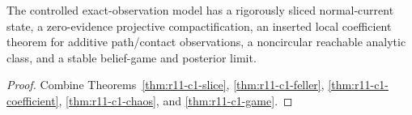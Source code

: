 \begin{theorem}
\label{thm:r11-c1-main}
The controlled exact-observation model has a rigorously sliced normal-current
state, a zero-evidence projective compactification, an inserted local
coefficient theorem for additive path/contact observations, a noncircular
reachable analytic class, and a stable belief-game and posterior limit.
\end{theorem}

\begin{proof}
Combine Theorems~\ref{thm:r11-c1-slice},
\ref{thm:r11-c1-feller}, \ref{thm:r11-c1-coefficient},
\ref{thm:r11-c1-chaos}, and \ref{thm:r11-c1-game}.
\end{proof}
